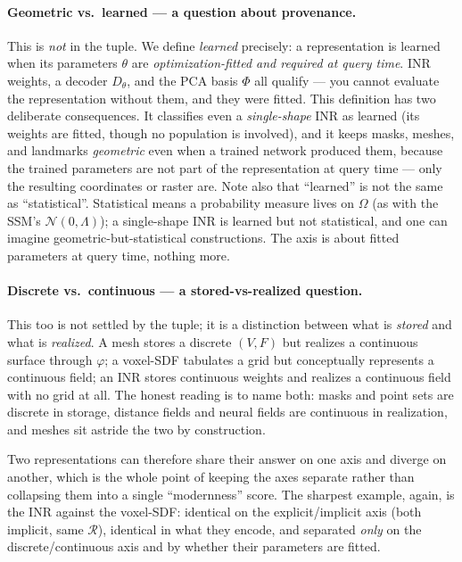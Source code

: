 \paragraph{Geometric vs.\ learned --- a question about provenance.} This is \emph{not} in the tuple. We
define \emph{learned} precisely: a representation is learned when its parameters $\theta$ are
\emph{optimization-fitted \emph{and} required at query time}. INR weights, a decoder $D_\theta$, and
the PCA basis $\Phi$ all qualify --- you cannot evaluate the representation without them, and they were
fitted. This definition has two deliberate consequences. It classifies even a \emph{single-shape} INR
as learned (its weights are fitted, though no population is involved), and it keeps masks, meshes, and
landmarks \emph{geometric} even when a trained network produced them, because the trained parameters are
not part of the representation at query time --- only the resulting coordinates or raster are. Note also
that ``learned'' is not the same as ``statistical''. Statistical means a probability measure lives on
$\Omega$ (as with the SSM's $\mathcal{N}(0,\Lambda)$); a single-shape INR is learned but not
statistical, and one can imagine geometric-but-statistical constructions. The axis is about fitted
parameters at query time, nothing more.

\paragraph{Discrete vs.\ continuous --- a stored-vs-realized question.} This too is not settled by the
tuple; it is a distinction between what is \emph{stored} and what is \emph{realized}. A mesh stores a
discrete $(V, F)$ but realizes a continuous surface through $\varphi$; a voxel-SDF tabulates a grid but
conceptually represents a continuous field; an INR stores continuous weights and realizes a continuous
field with no grid at all. The honest reading is to name both: masks and point sets are discrete in
storage, distance fields and neural fields are continuous in realization, and meshes sit astride the
two by construction.

Two representations can therefore share their answer on one axis and diverge on another, which is the
whole point of keeping the axes separate rather than collapsing them into a single ``modernness''
score. The sharpest example, again, is the INR against the voxel-SDF: identical on the
explicit/implicit axis (both implicit, same $\mathcal{R}$), identical in what they encode, and
separated \emph{only} on the discrete/continuous axis and by whether their parameters are fitted.

